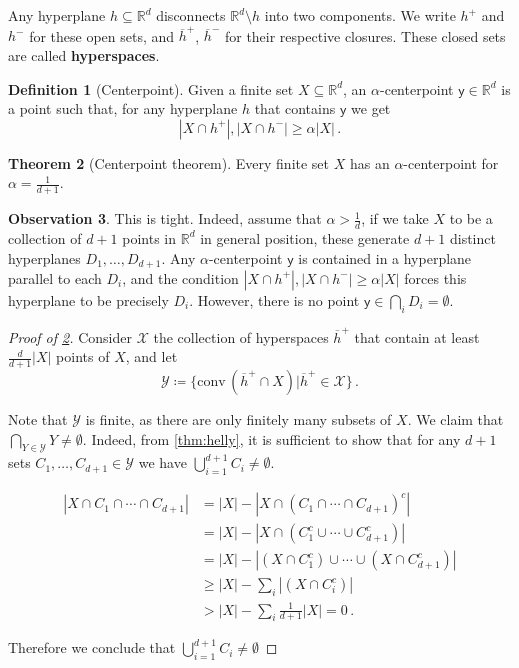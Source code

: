 \documentclass[12pt]{amsart}
\theoremstyle{definition}
\newtheorem{thm}{Theorem}[section]
\newtheorem{obs}[thm]{Observation}
\newtheorem{defin}[thm]{Definition}
\newcommand{\R}{\mathbb{R}}
\newcommand{\vy}{\mathsf{y}}
\newcommand{\conv}{\mathrm{conv}}
\begin{document}
Any hyperplane $h \subseteq \R^d$ disconnects $\R^d \setminus h$ into two components.
We write $h^+$ and $h^-$ for these open sets, and $\overline{h}^+$, $\overline{h}^-$ for their respective closures.
These closed sets are called \textbf{hyperspaces}.

\begin{defin}[Centerpoint]
Given a finite set $X \subseteq \R^d$, an $\alpha$-centerpoint $\vy \in \R^d$ is a point such that, for any hyperplane $h$ that contains $\vy$ we get
$$ |X \cap h^+|, |X\cap h^-| \geq \alpha |X| \, . $$
\end{defin}

\begin{thm}[Centerpoint theorem]\label{thm:centerpoint}
Every finite set $X$ has an $\alpha$-centerpoint for $\alpha = \frac{1}{d+1}$.
\end{thm}

\begin{obs}
This is tight.
Indeed, assume that $\alpha > \frac{1}{d}$, if we take $X$ to be a collection of $d+1$ points in $\R^d$ in general position, these generate $d+1$ distinct hyperplanes $D_1, \ldots, D_{d+1}$.
Any $\alpha$-centerpoint $\vy$ is contained in a hyperplane parallel to each $D_i$, and the condition $|X \cap h^+|, |X\cap h^-| \geq \alpha |X|$ forces this hyperplane to be precisely $D_i$.
However, there is no point $\vy \in \bigcap_i D_i = \emptyset$.
\end{obs}

\begin{proof}[Proof of \cref{thm:centerpoint}]
Consider $\mathcal X $ the collection of hyperspaces $\overline{h}^+$ that contain at least $\frac{d}{d+1}|X|$ points of $X$, and let 
$$ \mathcal Y \coloneqq \{ \conv \, (\overline{h}^+ \cap X) | \overline{h}^+ \in \mathcal X \}\, . $$

Note that $\mathcal Y $ is finite, as there are only finitely many subsets of $X$.
We claim that $\bigcap_{Y \in \mathcal Y} Y \neq \emptyset$.
Indeed, from \cref{thm:helly}, it is sufficient to show that for any $d+1$ sets $C_1, \ldots, C_{d+1} \in \mathcal Y$ we have $\bigcup_{i=1}^{d+1} C_i \neq \emptyset$.

\begin{align*}
|X \cap C_1\cap \cdots \cap C_{d+1} |  &= |X| - |X \cap (C_1 \cap \cdots \cap C_{d+1})^c | \\
&= |X| - |X \cap (C_1^c \cup \cdots \cup C_{d+1}^c) | \\
&= |X| - |(X \cap C_1^c) \cup \cdots \cup (X \cap C_{d+1}^c)|\\
&\geq |X| - \sum_i |(X \cap C_i^c)|\\
&> |X| - \sum_i \frac{1}{d+1} |X| = 0 \, .
\end{align*}

Therefore we conclude that $\bigcup_{i=1}^{d+1} C_i \neq \emptyset$
\end{proof}
\end{document}

